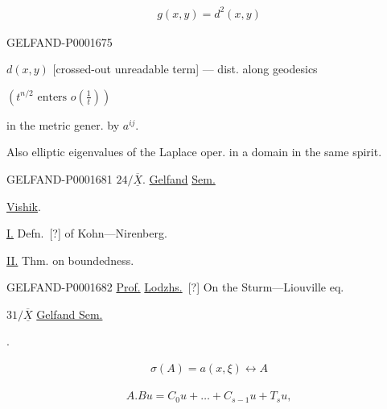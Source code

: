 \begin{gather*}
g (x, y)=d^2(x, y)
\end{gather*}

\begin{GelfandAdjacentEvidence}{GELFAND-P000167}{5}

$d (x, y)$ [crossed-out unreadable term] — dist. along geodesics
\end{GelfandAdjacentEvidence}

$(t^{n/2}\text{ enters }o (\frac{1}{t}))$

in the metric gener. by $a^{ij}$.


Also elliptic eigenvalues of the Laplace oper. in a domain in the same spirit.



\begin{GelfandAdjacentEvidence}{GELFAND-P000168}{1}
$24/\overline{\underline{X}}$. \underline{Gelfand} \underline{Sem.}

\underline{Vishik}. 


\underline{I.} Defn.\, [?] of Kohn—Nirenberg.

\underline{II.} Thm. on boundedness.
\end{GelfandAdjacentEvidence}


\begin{GelfandAdjacentEvidence}{GELFAND-P000168}{2}
\underline{Prof.} \underline{Lodzhs.}\, [?] On the Sturm—Liouville eq.
\end{GelfandAdjacentEvidence}


$31/\overline{\underline{X}}$ \underline{Gelfand Sem.}

. 

\begin{gather*}
\sigma (A)=a (x,\xi)\longleftrightarrow A
\end{gather*}

\begin{gather*}
A. Bu=C_0u+\ldots+C_{s-1}u+T_su,
\end{gather*}

